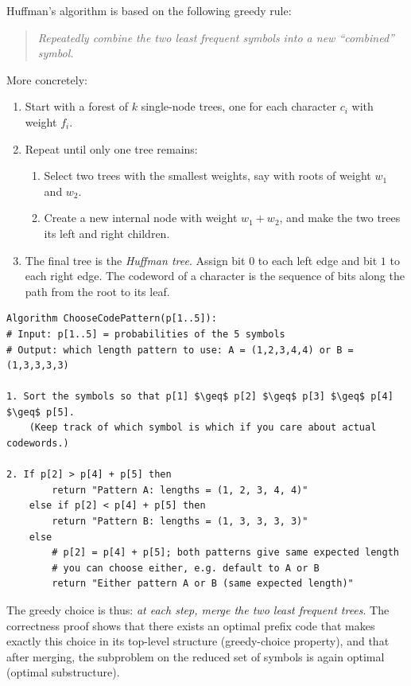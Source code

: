 \documentclass[9pt]{extarticle}
\begin{document}
Huffman’s algorithm is based on the following greedy rule:
\begin{quote}
    \emph{Repeatedly combine the two least frequent symbols into a new “combined” symbol.}
\end{quote}
More concretely:
\begin{enumerate}
    \item Start with a forest of \(k\) single-node trees, one for each character \(c_i\)
    with weight \(f_i\).
    \item Repeat until only one tree remains:
    \begin{enumerate}
        \item Select two trees with the smallest weights, say with roots of weight
              \(w_1\) and \(w_2\).
        \item Create a new internal node with weight \(w_1 + w_2\), and make the two
              trees its left and right children.
    \end{enumerate}
    \item The final tree is the \emph{Huffman tree}.
          Assign bit \(0\) to each left edge and bit \(1\) to each right edge.
          The codeword of a character is the sequence of bits along the path from the root
          to its leaf.
\end{enumerate}
\begin{lstlisting}[mathescape=true]
Algorithm ChooseCodePattern(p[1..5]):
# Input: p[1..5] = probabilities of the 5 symbols
# Output: which length pattern to use: A = (1,2,3,4,4) or B = (1,3,3,3,3)

1. Sort the symbols so that p[1] $\geq$ p[2] $\geq$ p[3] $\geq$ p[4] $\geq$ p[5].
    (Keep track of which symbol is which if you care about actual codewords.)

2. If p[2] > p[4] + p[5] then
        return "Pattern A: lengths = (1, 2, 3, 4, 4)"
    else if p[2] < p[4] + p[5] then
        return "Pattern B: lengths = (1, 3, 3, 3, 3)"
    else
        # p[2] = p[4] + p[5]; both patterns give same expected length
        # you can choose either, e.g. default to A or B
        return "Either pattern A or B (same expected length)"
\end{lstlisting}
The greedy choice is thus: \emph{at each step, merge the two least frequent
trees}. The correctness proof shows that there exists an optimal prefix code
that makes exactly this choice in its top-level structure (greedy-choice
property), and that after merging, the subproblem on the reduced set of symbols
is again optimal (optimal substructure).
\end{document}

